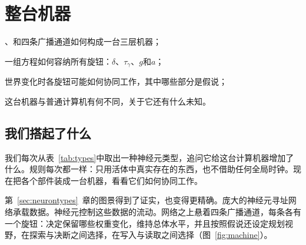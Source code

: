 \chapter{整台机器}
\label{sec:synthesis}
\begin{chaptergoals}
\item {}、和四条广播通道如何构成一台三层机器；
\item 一组方程如何容纳所有旋钮：$\delta$、$\tau_\gamma$、$g$和$a$；
\item 世界变化时各旋钮可能如何协同工作，其中哪些部分是假说；
\item 这台机器与普通计算机有何不同，关于它还有什么未知。
\end{chaptergoals}

\section{我们搭起了什么}

我们每次从表~\ref{tab:types}中取出一种神经元类型，追问它给这台计算机器增加了什么。规则每次都一样：只用活体中真实存在的东西，也不借助任何全局时钟。现在把各个部件装成一台机器，看看它们如何协同工作。

第~\ref{sec:neurontypes}~章的图景得到了证实，也变得更精确。庞大的神经元寻址网络承载数据。神经元控制这些数据的流动。网络之上悬着四条广播通道，每条各有一个旋钮：决定保留哪些权重变化，维持总体水平，并且按照假说还设定规划视野，在探索与决断之间选择，在写入与读取之间选择（图~\ref{fig:machine}）。

